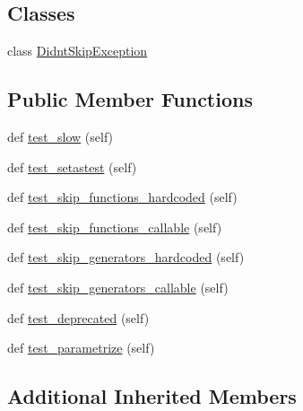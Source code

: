 \subsection*{Classes}
\begin{DoxyCompactItemize}
\item 
class \hyperlink{classnumpy_1_1core_1_1tests_1_1test__deprecations_1_1TestNoseDecoratorsDeprecated_1_1DidntSkipException}{Didnt\+Skip\+Exception}
\end{DoxyCompactItemize}
\subsection*{Public Member Functions}
\begin{DoxyCompactItemize}
\item 
def \hyperlink{classnumpy_1_1core_1_1tests_1_1test__deprecations_1_1TestNoseDecoratorsDeprecated_a20dc17f2318c701d832529457f40205e}{test\+\_\+slow} (self)
\item 
def \hyperlink{classnumpy_1_1core_1_1tests_1_1test__deprecations_1_1TestNoseDecoratorsDeprecated_a199fb9c2a31155460ab00d2ab4a88bb5}{test\+\_\+setastest} (self)
\item 
def \hyperlink{classnumpy_1_1core_1_1tests_1_1test__deprecations_1_1TestNoseDecoratorsDeprecated_ab62574674ef1342515fa858c6db2856d}{test\+\_\+skip\+\_\+functions\+\_\+hardcoded} (self)
\item 
def \hyperlink{classnumpy_1_1core_1_1tests_1_1test__deprecations_1_1TestNoseDecoratorsDeprecated_a4adb29c9701e8860d30516c03e4e5651}{test\+\_\+skip\+\_\+functions\+\_\+callable} (self)
\item 
def \hyperlink{classnumpy_1_1core_1_1tests_1_1test__deprecations_1_1TestNoseDecoratorsDeprecated_a94f41cc19c0573057e64bfa31f37a075}{test\+\_\+skip\+\_\+generators\+\_\+hardcoded} (self)
\item 
def \hyperlink{classnumpy_1_1core_1_1tests_1_1test__deprecations_1_1TestNoseDecoratorsDeprecated_a455e3b691ffbcd60eca991733727530c}{test\+\_\+skip\+\_\+generators\+\_\+callable} (self)
\item 
def \hyperlink{classnumpy_1_1core_1_1tests_1_1test__deprecations_1_1TestNoseDecoratorsDeprecated_a1e693a58c2db780063198f730b83a573}{test\+\_\+deprecated} (self)
\item 
def \hyperlink{classnumpy_1_1core_1_1tests_1_1test__deprecations_1_1TestNoseDecoratorsDeprecated_ad9fbb65636df64a92e0f8e620fdad0d2}{test\+\_\+parametrize} (self)
\end{DoxyCompactItemize}
\subsection*{Additional Inherited Members}


